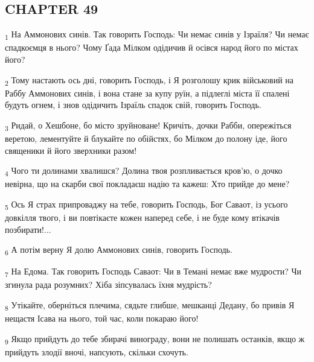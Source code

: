 \subsection{CHAPTER 49}
\begin{tcolorbox}
\textsubscript{1} На Аммонових синів. Так говорить Господь: Чи немає синів у Ізраїля? Чи немає спадкоємця в нього? Чому Ґада Мілком одідичив й осівся народ його по містах його?
\end{tcolorbox}
\begin{tcolorbox}
\textsubscript{2} Тому настають ось дні, говорить Господь, і Я розголошу крик військовий на Раббу Аммонових синів, і вона стане за купу руїн, а підлеглі міста її спалені будуть огнем, і знов одідичить Ізраїль спадок свій, говорить Господь.
\end{tcolorbox}
\begin{tcolorbox}
\textsubscript{3} Ридай, о Хешбоне, бо місто зруйноване! Кричіть, дочки Рабби, опережіться веретою, лементуйте й блукайте по обійстях, бо Мілком до полону іде, його священики й його зверхники разом!
\end{tcolorbox}
\begin{tcolorbox}
\textsubscript{4} Чого ти долинами хвалишся? Долина твоя розпливається кров'ю, о дочко невірна, що на скарби свої покладаєш надію та кажеш: Хто прийде до мене?
\end{tcolorbox}
\begin{tcolorbox}
\textsubscript{5} Ось Я страх припроваджу на тебе, говорить Господь, Бог Саваот, із усього довкілля твого, і ви повтікаєте кожен наперед себе, і не буде кому втікачів позбирати!...
\end{tcolorbox}
\begin{tcolorbox}
\textsubscript{6} А потім верну Я долю Аммонових синів, говорить Господь.
\end{tcolorbox}
\begin{tcolorbox}
\textsubscript{7} На Едома. Так говорить Господь Саваот: Чи в Темані немає вже мудрости? Чи згинула рада розумних? Хіба зіпсувалась їхня мудрість?
\end{tcolorbox}
\begin{tcolorbox}
\textsubscript{8} Утікайте, оберніться плечима, сядьте глибше, мешканці Дедану, бо привів Я нещастя Ісава на нього, той час, коли покараю його!
\end{tcolorbox}
\begin{tcolorbox}
\textsubscript{9} Якщо прийдуть до тебе збирачі винограду, вони не полишать останків, якщо ж прийдуть злодії вночі, напсують, скільки схочуть.
\end{tcolorbox}
